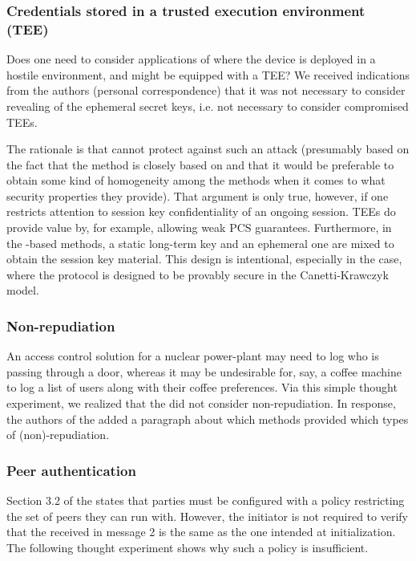 \documentclass[runningheads,draft,x11names]{llncs}
\begin{document}
\subsubsection{Credentials stored in a trusted execution environment (TEE)}
Does one need to consider applications of \mEdhoc{} where the device is
deployed in a hostile environment, and might be equipped with a TEE? We received indications from the \mSpec{} authors (personal correspondence) that it was not necessary to consider revealing of the ephemeral secret keys, i.e. not necessary to consider compromised TEEs. 

The rationale is that \mSigma{} cannot protect against such an attack (presumably based on the fact that the \mSigSig{} method is closely based on \mSigmaI{} and that it would be preferable to obtain some kind of homogeneity among the \mEdhoc{} methods when it comes to what security properties they provide). 
%
That argument is only true, however, if one restricts attention to session key confidentiality of an ongoing session. TEEs do provide value by, for example, allowing weak PCS guarantees. Furthermore, in the \mStat{}-based methods, a static long-term key and an ephemeral one are mixed to obtain the session key material. This design is intentional, especially in the \mOptls{} case, where the protocol is designed to be provably secure in the Canetti-Krawczyk model. 
%

\subsubsection{Non-repudiation}
An access control solution for a nuclear power-plant may need to log who is passing through a door, whereas it may be undesirable for, say, a coffee machine to log a list of users along with their coffee preferences. Via this simple thought experiment, we realized that the \mSpec{} did not
consider non-repudiation. In response, the authors of the \mSpec{} added a paragraph about which methods provided which types of (non)-repudiation.

\subsubsection{Peer authentication}
Section 3.2 of the \mSpec{} states that parties must be configured
with a policy restricting the set of peers they can run \mEdhoc{} with. However, the initiator is not required to verify that the \mIdcredr{} received in message 2 is the same as the one intended at initialization. The following thought experiment shows why such a policy is insufficient.
\end{document}
